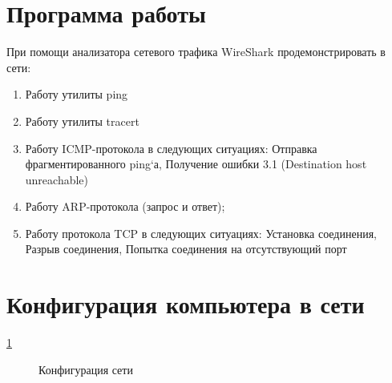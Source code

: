 \documentclass[a4paper, 14pt,russian]{article}
\begin{document}
\section{Программа работы}
При помощи анализатора сетевого трафика WireShark продемонстрировать в сети:
\begin{enumerate}
	
	\item Работу утилиты ping
	\item Работу утилиты tracert
	\item Работу ICMP-протокола в следующих ситуациях:
	\subitem Отправка фрагментированного ping`а,
	\subitem Получение ошибки 3.1 (Destination host unreachable)
	\item Работу ARP-протокола (запрос и ответ);
	\item Работу протокола TCP в следующих ситуациях:
	\subitem Установка соединения,
	\subitem Разрыв соединения,
	\subitem Попытка соединения на отсутствующий порт
\end{enumerate}

\section{Конфигурация компьютера в сети}
\ref{img:system}
\begin{figure}[h]
	\caption{Конфигурация сети}
	\label{img:system}
\end{figure}
\end{document}
